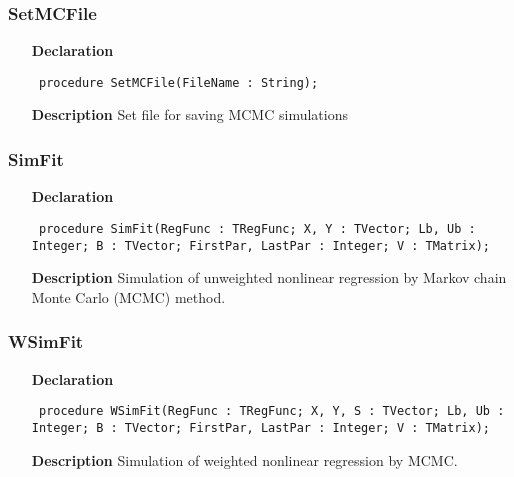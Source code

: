 \documentclass[12pt,a4paper,oneside]{report}
\newcommand{\declarationitem}[1]{\textbf{#1}}
\newcommand{\descriptiontitle}[1]{\textbf{#1}}
\newcommand{\code}[1]{\texttt{#1}}
\begin{document}
\subsubsection{SetMCFile}
\label{unlfit-SetMCFile}
\begin{itemize}\item[\declarationitem{Declaration}\hfill]
	\begin{flushleft}
		\code{
			procedure SetMCFile(FileName : String);}
		
	\end{flushleft}
	
	\par
	\item[\descriptiontitle{Description}]
	Set file for saving MCMC simulations
	
\end{itemize}
\subsubsection{SimFit}
\label{unlfit-SimFit}
\begin{itemize}\item[\declarationitem{Declaration}\hfill]
	\begin{flushleft}
		\code{
			procedure SimFit(RegFunc : TRegFunc; X, Y : TVector; Lb, Ub : Integer; B : TVector; FirstPar, LastPar : Integer; V : TMatrix);}
		
	\end{flushleft}
	
	\par
	\item[\descriptiontitle{Description}]
	Simulation of unweighted nonlinear regression by Markov chain Monte Carlo (MCMC) method.
	
\end{itemize}
\subsubsection{WSimFit}
\label{unlfit-WSimFit}
\begin{itemize}\item[\declarationitem{Declaration}\hfill]
	\begin{flushleft}
		\code{
			procedure WSimFit(RegFunc : TRegFunc; X, Y, S : TVector; Lb, Ub : Integer; B : TVector; FirstPar, LastPar : Integer; V : TMatrix);}
		
	\end{flushleft}
	
	\par
	\item[\descriptiontitle{Description}]
	Simulation of weighted nonlinear regression by MCMC.
\end{itemize}
\end{document}
